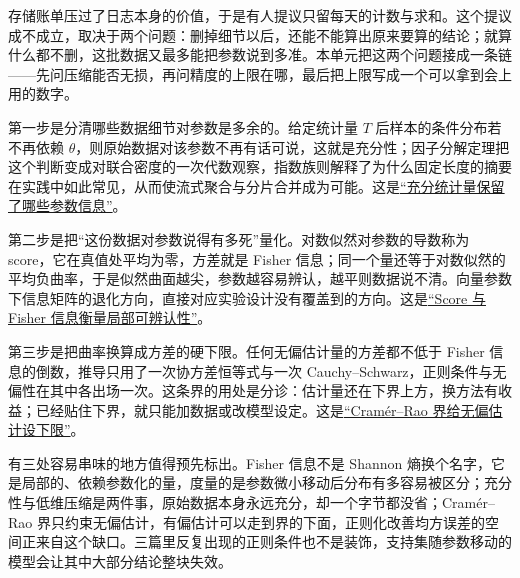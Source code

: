 存储账单压过了日志本身的价值，于是有人提议只留每天的计数与求和。这个提议成不成立，取决于两个问题：删掉细节以后，还能不能算出原来要算的结论；就算什么都不删，这批数据又最多能把参数说到多准。本单元把这两个问题接成一条链——先问压缩能否无损，再问精度的上限在哪，最后把上限写成一个可以拿到会上用的数字。

第一步是分清哪些数据细节对参数是多余的。给定统计量 \(T\) 后样本的条件分布若不再依赖 \(\theta\)，则原始数据对该参数不再有话可说，这就是充分性；因子分解定理把这个判断变成对联合密度的一次代数观察，指数族则解释了为什么固定长度的摘要在实践中如此常见，从而使流式聚合与分片合并成为可能。这是\hyperref[sec:11-Mathematical-Statistics/03-Sufficient-Statistics-and-Information/01]{``充分统计量保留了哪些参数信息''}。

第二步是把``这份数据对参数说得有多死''量化。对数似然对参数的导数称为 score，它在真值处平均为零，方差就是 Fisher 信息；同一个量还等于对数似然的平均负曲率，于是似然曲面越尖，参数越容易辨认，越平则数据说不清。向量参数下信息矩阵的退化方向，直接对应实验设计没有覆盖到的方向。这是\hyperref[sec:11-Mathematical-Statistics/03-Sufficient-Statistics-and-Information/02]{``Score 与 Fisher 信息衡量局部可辨认性''}。

第三步是把曲率换算成方差的硬下限。任何无偏估计量的方差都不低于 Fisher 信息的倒数，推导只用了一次协方差恒等式与一次 Cauchy--Schwarz，正则条件与无偏性在其中各出场一次。这条界的用处是分诊：估计量还在下界上方，换方法有收益；已经贴住下界，就只能加数据或改模型设定。这是\hyperref[sec:11-Mathematical-Statistics/03-Sufficient-Statistics-and-Information/03]{``Cramér--Rao 界给无偏估计设下限''}。

有三处容易串味的地方值得预先标出。Fisher 信息不是 Shannon 熵换个名字，它是局部的、依赖参数化的量，度量的是参数微小移动后分布有多容易被区分；充分性与低维压缩是两件事，原始数据本身永远充分，却一个字节都没省；Cramér--Rao 界只约束无偏估计，有偏估计可以走到界的下面，正则化改善均方误差的空间正来自这个缺口。三篇里反复出现的正则条件也不是装饰，支持集随参数移动的模型会让其中大部分结论整块失效。
